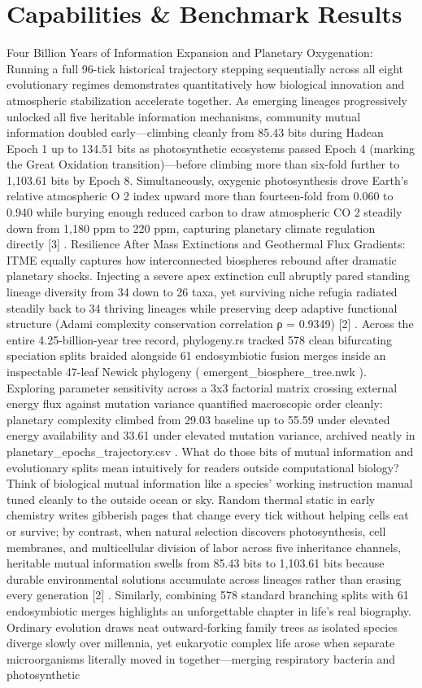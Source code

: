 \documentclass[10pt,letterpaper]{article}
\begin{document}
\section{Capabilities \& Benchmark Results}
Four Billion Years of Information Expansion and Planetary Oxygenation: Running a full 96-tick historical trajectory stepping sequentially across all eight evolutionary regimes demonstrates quantitatively how biological innovation and atmospheric stabilization accelerate together. As emerging lineages progressively unlocked all five heritable information mechanisms, community mutual information doubled early---climbing cleanly from 85.43 bits during Hadean Epoch 1 up to 134.51 bits as photosynthetic ecosystems passed Epoch 4 (marking the Great Oxidation transition)---before climbing more than six-fold further to 1,103.61 bits by Epoch 8. Simultaneously, oxygenic photosynthesis drove Earth's relative atmospheric O 2 index upward more than fourteen-fold from 0.060 to 0.940 while burying enough reduced carbon to draw atmospheric CO 2 steadily down from 1,180 ppm to 220 ppm, capturing planetary climate regulation directly [3] . Resilience After Mass Extinctions and Geothermal Flux Gradients: ITME equally captures how interconnected biospheres rebound after dramatic planetary shocks. Injecting a severe apex extinction cull abruptly pared standing lineage diversity from 34 down to 26 taxa, yet surviving niche refugia radiated steadily back to 34 thriving lineages while preserving deep adaptive functional structure (Adami complexity conservation correlation ρ = 0.9349) [2] . Across the entire 4.25-billion-year tree record, phylogeny.rs tracked 578 clean bifurcating speciation splits braided alongside 61 endosymbiotic fusion merges inside an inspectable 47-leaf Newick phylogeny ( emergent\_biosphere\_tree.nwk ). Exploring parameter sensitivity across a 3x3 factorial matrix crossing external energy flux against mutation variance quantified macroscopic order cleanly: planetary complexity climbed from 29.03 baseline up to 55.59 under elevated energy availability and 33.61 under elevated mutation variance, archived neatly in planetary\_epochs\_trajectory.csv . What do those bits of mutual information and evolutionary splits mean intuitively for readers outside computational biology? Think of biological mutual information like a species' working instruction manual tuned cleanly to the outside ocean or sky. Random thermal static in early chemistry writes gibberish pages that change every tick without helping cells eat or survive; by contrast, when natural selection discovers photosynthesis, cell membranes, and multicellular division of labor across five inheritance channels, heritable mutual information swells from 85.43 bits to 1,103.61 bits because durable environmental solutions accumulate across lineages rather than erasing every generation [2] . Similarly, combining 578 standard branching splits with 61 endosymbiotic merges highlights an unforgettable chapter in life's real biography. Ordinary evolution draws neat outward-forking family trees as isolated species diverge slowly over millennia, yet eukaryotic complex life arose when separate microorganisms literally moved in together---merging respiratory bacteria and photosynthetic 
\end{document}
